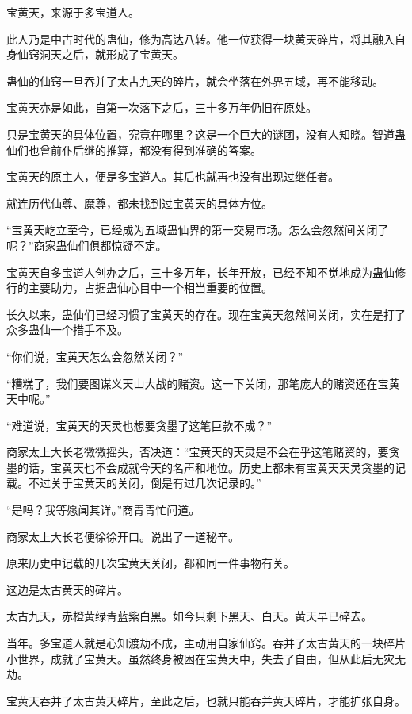
\begin{this_body}

宝黄天，来源于多宝道人。

此人乃是中古时代的蛊仙，修为高达八转。他一位获得一块黄天碎片，将其融入自身仙窍洞天之后，就形成了宝黄天。

蛊仙的仙窍一旦吞并了太古九天的碎片，就会坐落在外界五域，再不能移动。

宝黄天亦是如此，自第一次落下之后，三十多万年仍旧在原处。

只是宝黄天的具体位置，究竟在哪里？这是一个巨大的谜团，没有人知晓。智道蛊仙们也曾前仆后继的推算，都没有得到准确的答案。

宝黄天的原主人，便是多宝道人。其后也就再也没有出现过继任者。

就连历代仙尊、魔尊，都未找到过宝黄天的具体方位。

“宝黄天屹立至今，已经成为五域蛊仙界的第一交易市场。怎么会忽然间关闭了呢？”商家蛊仙们俱都惊疑不定。

宝黄天自多宝道人创办之后，三十多万年，长年开放，已经不知不觉地成为蛊仙修行的主要助力，占据蛊仙心目中一个相当重要的位置。

长久以来，蛊仙们已经习惯了宝黄天的存在。现在宝黄天忽然间关闭，实在是打了众多蛊仙一个措手不及。

“你们说，宝黄天怎么会忽然关闭？”

“糟糕了，我们要图谋义天山大战的赌资。这一下关闭，那笔庞大的赌资还在宝黄天中呢。”

“难道说，宝黄天的天灵也想要贪墨了这笔巨款不成？”

商家太上大长老微微摇头，否决道：“宝黄天的天灵是不会在乎这笔赌资的，要贪墨的话，宝黄天也不会成就今天的名声和地位。历史上都未有宝黄天天灵贪墨的记载。不过关于宝黄天的关闭，倒是有过几次记录的。”

“是吗？我等愿闻其详。”商青青忙问道。

商家太上大长老便徐徐开口。说出了一道秘辛。

原来历史中记载的几次宝黄天关闭，都和同一件事物有关。

这边是太古黄天的碎片。

太古九天，赤橙黄绿青蓝紫白黑。如今只剩下黑天、白天。黄天早已碎去。

当年。多宝道人就是心知渡劫不成，主动用自家仙窍。吞并了太古黄天的一块碎片小世界，成就了宝黄天。虽然终身被困在宝黄天中，失去了自由，但从此后无灾无劫。

宝黄天吞并了太古黄天碎片，至此之后，也就只能吞并黄天碎片，才能扩张自身。


\end{this_body}
